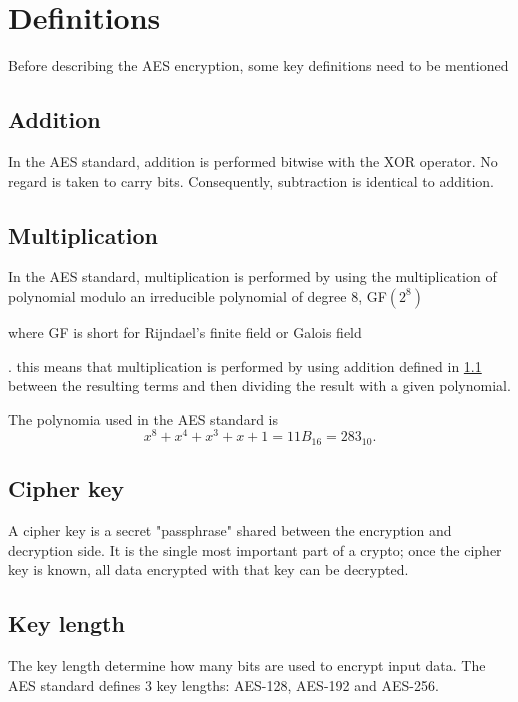 \documentclass[report.tex]{subfiles}
\begin{document}
\section{Definitions}
Before describing the AES encryption, some key definitions need to be mentioned

\subsection{Addition}\label{sec:addition}
In the AES standard, addition is performed bitwise with the XOR operator. No regard is taken to carry bits. Consequently, subtraction is identical to addition.

\subsection{Multiplication}\label{sec:multiplication}
In the AES standard, multiplication is performed by using the multiplication of polynomial modulo an irreducible polynomial of degree 8, GF$\left(2^{8}\right)$ 
\begin{comment}
	\cite[Sec.~4.2]{AES Standard}
\end{comment}
where GF is short for Rijndael's finite field or Galois field 
\begin{comment}
	\cite{GF} page = http://en.wikipedia.org/wiki/Rijndael_Galois_field#Rijndael.27s_finite_field, date=2011-11-14
\end{comment}
. this means that multiplication is performed by using addition defined in \ref{sec:addition} between the resulting terms and then dividing the result with a given polynomial.

The polynomia used in the AES standard is
\begin{equation} \label{eq:multiplication polynomial}
	{x^{8} + x^{4} + x^{3} + x + 1} = 11B_{16} = 283_{10}.
\end{equation}


\subsection{Cipher key}
A cipher key is a secret "passphrase" shared between the encryption and decryption side. It is the single most important part of a crypto; once the cipher key is known, all data encrypted with that key can be decrypted.

\subsection{Key length} \label{sec:key length}
The key length determine how many bits are used to encrypt input data. The AES standard defines 3 key lengths: AES-128, AES-192 and AES-256.
\end{document}
